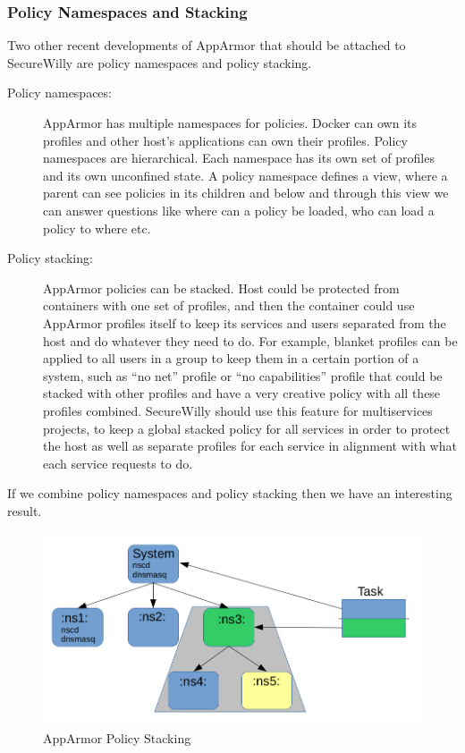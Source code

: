\subsubsection{Policy Namespaces and Stacking}
Two other recent developments of AppArmor that should be attached to SecureWilly are policy namespaces and policy stacking. \cite{app3suse}
\begin{description}
\item[Policy namespaces:] AppArmor has multiple namespaces for policies. Docker can own its profiles and other host's applications can own their profiles. Policy namespaces are hierarchical.  Each namespace has its own set of profiles and its own unconfined state. A policy namespace defines a view, where a parent can see policies in its children and below and through this view we can answer questions like where can a policy be loaded, who can load a policy to where etc. 

\item[Policy stacking:] AppArmor policies can be stacked. Host could be protected from containers with one set of profiles, and then the container could use AppArmor profiles itself to keep its services and users separated from the host and do whatever they need to do. For example, blanket profiles can be applied to all users in a group to keep them in a certain portion of a system, such as “no net” profile or “no capabilities” profile that could be stacked with other profiles and have a very creative policy with all these profiles combined. SecureWilly should use this feature for multiservices projects, to keep a global stacked policy for all services in order to protect the host as well as separate profiles for each service in alignment with what each service requests to do.
\end{description}

If we combine policy namespaces and policy stacking then we have an interesting result.

\begin{figure}[H]
  \centering
   \includegraphics[width=0.9\linewidth]{./figures/policystacking1.png}
   \caption{AppArmor Policy Stacking}
\end{figure}

